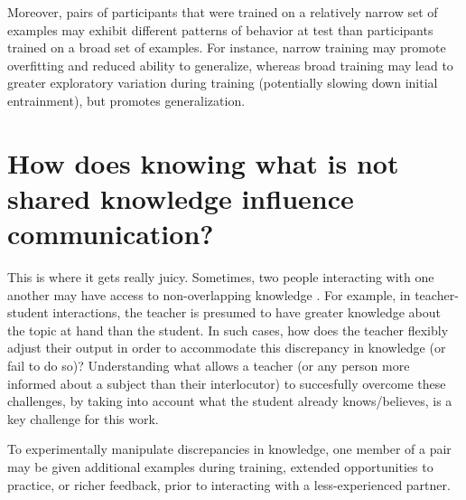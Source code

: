 \documentclass[12pt]{article}
\begin{document}
Moreover, pairs of participants that were trained on a relatively narrow set of examples may exhibit different patterns of behavior at test than participants trained on a broad set of examples. For instance, narrow training may promote overfitting and reduced ability to generalize, whereas broad training may lead to greater exploratory variation during training (potentially slowing down initial entrainment), but promotes generalization. 

\section{How does knowing what is not shared knowledge influence communication? }

This is where it gets really juicy. Sometimes, two people interacting with one another may have access to non-overlapping knowledge \cite{Wu:2007tz}. For example, in teacher-student interactions, the teacher is presumed to have greater knowledge about the topic at hand than the student. In such cases, how does the teacher flexibly adjust their output in order to accommodate this discrepancy in knowledge (or fail to do so)? Understanding what allows a teacher (or any person more informed about a subject than their interlocutor) to succesfully overcome these challenges, by taking into account what the student already knows/believes, is a key challenge for this work. 

To experimentally manipulate discrepancies in knowledge, one member of a pair may be given additional examples during training, extended opportunities to practice, or richer feedback, prior to interacting with a less-experienced partner. 


\setlength{\bibleftmargin}{.125in}
\setlength{\bibindent}{-\bibleftmargin}

\end{document}
